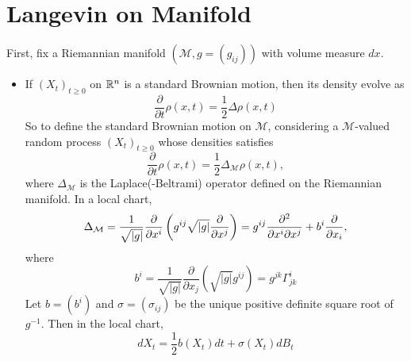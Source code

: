 \documentclass[a4paper,12pt]{article}
\begin{document}
\section{Langevin on Manifold}
First, fix a Riemannian manifold $(\mathcal{M},g=(g_{ij}))$ with volume measure $dx$.
\begin{itemize}
  \item If $(X_t)_{t \geqslant 0}$ on $\mathbb{R}^n$ is a standard Brownian motion, then its density evolve as
  \begin{equation*}
    \frac{\partial}{\partial t} \rho(x,t) = \frac{1}{2}\Delta \rho(x,t)
  \end{equation*}
  So to define the standard Brownian motion on $\mathcal{M}$, considering a $\mathcal{M}$-valued random process $(X_t)_{t \geqslant 0}$ whose densities satisfies
  \begin{equation*}
    \frac{\partial}{\partial t} \rho(x,t) = \frac{1}{2}\Delta_\mathcal{M} \rho(x,t),
  \end{equation*}
  where $\Delta_\mathcal{M}$ is the Laplace(-Beltrami) operator defined on the Riemannian manifold. In a local chart,
  \begin{equation*}
    \Delta_\mathcal{M} = \frac{1}{\sqrt{\left\lvert g\right\lvert}}\frac{\partial}{\partial x^i}\left(g^{ij}\sqrt{\left\lvert g\right\lvert}\frac{\partial}{\partial x^j}\right) = g^{ij}\frac{\partial^2}{\partial x^i \partial x^j} + b^i\frac{\partial}{\partial x_i},
  \end{equation*}
  where
  \begin{equation*}
    b^i = \frac{1}{\sqrt{|g|}} \frac{\partial}{\partial x_j}\left(\sqrt{|g|} g^{i j}\right)= g^{j k} \Gamma_{j k}^i
  \end{equation*}
  Let $b = (b^i)$ and $\sigma = (\sigma_{ij})$ be the unique positive definite square root of $g^{-1}$. Then in the local chart,
  \begin{equation*}
    dX_t = \frac{1}{2}b(X_t)dt + \sigma(X_t)dB_t
  \end{equation*}


\end{itemize}
\end{document}
